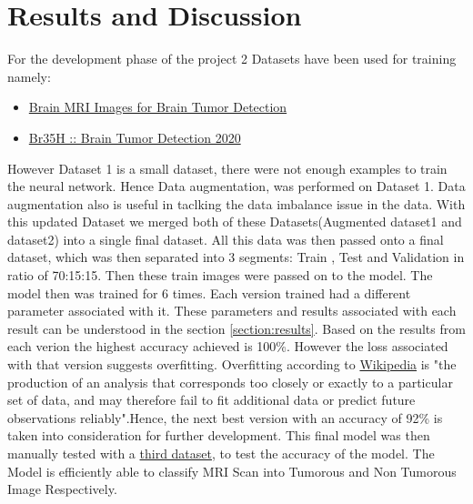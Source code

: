 \chapter{Results and Discussion}
For the development phase of the project 2 Datasets have been used for training namely: 
\begin{itemize}
    \item \href{https://www.kaggle.com/navoneel/brain-mri-images-for-brain-tumor-detection}{Brain MRI Images for Brain Tumor Detection}
    \item \href{https://www.kaggle.com/ahmedhamada0/brain-tumor-detection}{Br35H :: Brain Tumor Detection 2020}
\end{itemize}
However Dataset 1 is a small dataset, there were not enough examples to train the neural network. Hence Data augmentation, was performed on Dataset 1. Data augmentation also is useful in taclking the data imbalance issue in the data. With this updated Dataset we merged both of these Datasets(Augmented dataset1 and dataset2) into a single final dataset. All this data was then passed onto a final dataset, which was then separated into 3 segments: Train , Test and Validation in ratio of 70:15:15. Then these train images were passed on to the model. The model then was trained for 6 times. Each version trained had a different parameter associated with it. These parameters and results associated with each result can be understood in the section \ref{section:results}.
Based on the results from each verion the highest accuracy achieved is 100\%. However the loss associated with that version suggests overfitting. Overfitting according to \href{https://en.wikipedia.org/wiki/Overfitting}{Wikipedia} is "the production of an analysis that corresponds too closely or exactly to a particular set of data, and may therefore fail to fit additional data or predict future observations reliably".Hence, the next best version with an accuracy of 92\% is taken into consideration for further development. This final model was then manually tested with a \href{https://www.kaggle.com/preetviradiya/brian-tumor-dataset}{third dataset}, to test the accuracy of the model. The Model is efficiently able to classify MRI Scan into Tumorous and Non Tumorous Image Respectively.

